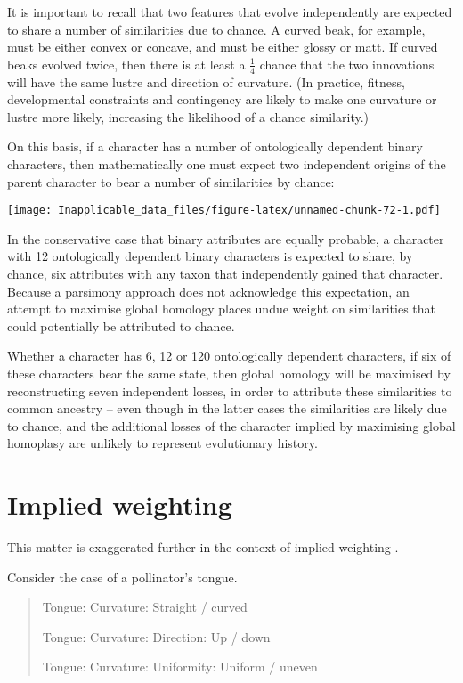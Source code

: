 \documentclass[]{book}
\theoremstyle{definition}
\theoremstyle{definition}
\theoremstyle{definition}
\theoremstyle{remark}
\begin{document}
It is important to recall that two features that evolve independently
are expected to share a number of similarities due to chance. A curved
beak, for example, must be either convex or concave, and must be either
glossy or matt. If curved beaks evolved twice, then there is at least a
\(\frac{1}{4}\) chance that the two innovations will have the same
lustre and direction of curvature. (In practice, fitness, developmental
constraints and contingency are likely to make one curvature or lustre
more likely, increasing the likelihood of a chance similarity.)

On this basis, if a character has a number of ontologically dependent
binary characters, then mathematically one must expect two independent
origins of the parent character to bear a number of similarities by
chance:

\texttt{[image: Inapplicable\_data\_files/figure-latex/unnamed-chunk-72-1.pdf]}

In the conservative case that binary attributes are equally probable, a
character with 12 ontologically dependent binary characters is expected
to share, by chance, six attributes with any taxon that independently
gained that character. Because a parsimony approach does not acknowledge
this expectation, an attempt to maximise global homology places undue
weight on similarities that could potentially be attributed to chance.

Whether a character has 6, 12 or 120 ontologically dependent characters,
if six of these characters bear the same state, then global homology
will be maximised by reconstructing seven independent losses, in order
to attribute these similarities to common ancestry -- even though in the
latter cases the similarities are likely due to chance, and the
additional losses of the character implied by maximising global
homoplasy are unlikely to represent evolutionary history.

\section{Implied weighting}\label{implied-weighting}

This matter is exaggerated further in the context of implied weighting
\citep{Goloboff1993, Goloboff2014}.

Consider the case of a pollinator's tongue.

\begin{quote}
Tongue: Curvature: Straight / curved

Tongue: Curvature: Direction: Up / down

Tongue: Curvature: Uniformity: Uniform / uneven
\end{quote}
\end{document}

